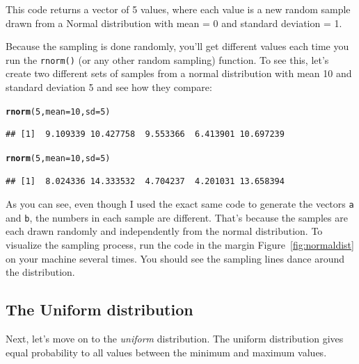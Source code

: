 \documentclass{tufte-book}\usepackage[]{graphicx}\usepackage[]{color}
\makeatletter
\newcommand{\hlnum}[1]{\textcolor[rgb]{0.686,0.059,0.569}{#1}}%
\newcommand{\hlstd}[1]{\textcolor[rgb]{0.345,0.345,0.345}{#1}}%
\newcommand{\hlkwc}[1]{\textcolor[rgb]{0.333,0.667,0.333}{#1}}%
\newcommand{\hlkwd}[1]{\textcolor[rgb]{0.737,0.353,0.396}{\textbf{#1}}}%
\newenvironment{kframe}{%
 \def\at@end@of@kframe{}%
 \ifinner\ifhmode%
  \def\at@end@of@kframe{\end{minipage}}%
  \begin{minipage}{\columnwidth}%
 \fi\fi%
 \def\FrameCommand##1{\hskip\@totalleftmargin \hskip-\fboxsep
 \colorbox{shadecolor}{##1}\hskip-\fboxsep
     \hskip-\linewidth \hskip-\@totalleftmargin \hskip\columnwidth}%
 \MakeFramed {\advance\hsize-\width
   \@totalleftmargin\z@ \linewidth\hsize
   \@setminipage}}%
 {\par\unskip\endMakeFramed%
 \at@end@of@kframe}
\newenvironment{knitrout}{}{} %
\makeatother
\begin{document}
This code returns a vector of 5 values, where each value is a new random sample drawn from a Normal distribution with mean = 0 and standard deviation = 1.

Because the sampling is done randomly, you'll get different values each time you run the \texttt{rnorm()} (or any other random sampling) function. To see this, let's create two different sets of samples from a normal distribution with mean 10 and standard deviation 5 and see how they compare:

\begin{knitrout}
\color{fgcolor}\begin{kframe}
\begin{alltt}
\hlkwd{rnorm}\hlstd{(}\hlnum{5}\hlstd{,} \hlkwc{mean} \hlstd{=} \hlnum{10}\hlstd{,} \hlkwc{sd} \hlstd{=} \hlnum{5}\hlstd{)}
\end{alltt}
\begin{verbatim}
## [1]  9.109339 10.427758  9.553366  6.413901 10.697239
\end{verbatim}
\begin{alltt}
\hlkwd{rnorm}\hlstd{(}\hlnum{5}\hlstd{,} \hlkwc{mean} \hlstd{=} \hlnum{10}\hlstd{,} \hlkwc{sd} \hlstd{=} \hlnum{5}\hlstd{)}
\end{alltt}
\begin{verbatim}
## [1]  8.024336 14.333532  4.704237  4.201031 13.658394
\end{verbatim}
\end{kframe}
\end{knitrout}


As you can see, even though I used the exact same code to generate the vectors \texttt{a} and \texttt{b}, the numbers in each sample are different. That's because the samples are each drawn randomly and independently from the normal distribution. To visualize the sampling process, run the code in the margin Figure~\ref{fig:normaldist} on your machine several times. You should see the sampling lines dance around the distribution.

\subsection{The Uniform distribution}

Next, let's move on to the \textit{uniform} distribution. The uniform distribution gives equal probability to all values between the minimum and maximum values.
\end{document}
